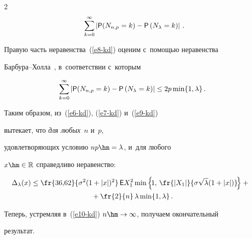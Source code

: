 \begin{multicols}{2}
\begin{multline}
\sum\limits_{k=0}^{\infty}\left\vert {\sf P}(N_{n,p}=k)-{\sf P}


\left(N_{\lambda}=k\right)\right\vert\,.\!\!\!\!


\label{e8-kd}


\end{multline}


Правую часть неравенства~(\ref{e8-kd}) оценим с~помощью неравенства


Бар\-бу\-ра--Хол\-ла~\cite{BarbourHallPoisson}, в~соответствии с~которым


\begin{equation}


\sum\limits_{k=0}^{\infty}\left\vert {\sf P}(N_{n,p}=k)-{\sf P}


\left(N_{\lambda}=k\right)\right\vert \le 2p\min\{1,\lambda\}\,.


\label{e9-kd}


\end{equation}


Таким образом, из~(\ref{e6-kd}), (\ref{e7-kd}) и~(\ref{e9-kd}) 


вытекает, что \textit{для любых}~$n$ и~$p$, 


удовлетворяющих условию $np\hm=\lambda$, и~для любого


$x\hm\in\mathbb{R}$ справедливо неравенство:


\begin{multline}


\hspace*{-1.5mm}\Delta_{\lambda}(x)\le \fr{36{,}62}{\sigma^2(1+|x|)^2}\, {\sf E}


X_1^2\min\left\{\!1,\,\fr{|X_1|}{\sigma\sqrt{\lambda}(1+|x|)}\!\right\} +{}\hspace*{-0.44373pt}\\


{}+


\fr{2}{n}\,\lambda\min\{1,\lambda\}\,.


\label{e10-kd}


\end{multline}


Теперь, устремляя в~(\ref{e10-kd}) $n\hm\to\infty$, получаем окончательный


результат.





\smallskip





\noindent



\end{multicols}
